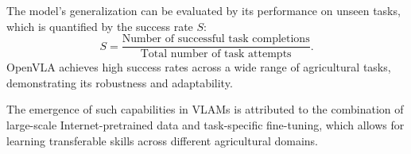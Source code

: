 The model's generalization can be evaluated by its performance on unseen tasks, which is quantified by the success rate $S$:
\[
S = \frac{\text{Number of successful task completions}}{\text{Total number of task attempts}}.
\]
OpenVLA achieves high success rates across a wide range of agricultural tasks, demonstrating its robustness and adaptability.

The emergence of such capabilities in VLAMs is attributed to the combination of large-scale Internet-pretrained data and task-specific fine-tuning, which allows for learning transferable skills across different agricultural domains.

